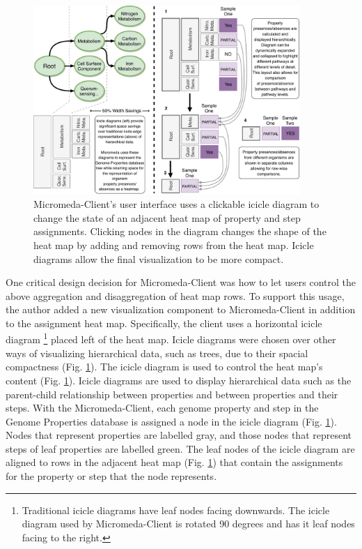 \begin{figure}[!ht]
  \centering
	\includegraphics[width=0.9\textwidth]{media/visualization_design_philosphy.pdf}
	 \caption{Micromeda-Client's user interface uses a clickable icicle diagram to change the state of an adjacent heat map of property and step assignments. Clicking nodes in the diagram changes the shape of the heat map by adding and removing rows from the heat map. Icicle diagrams allow the final visualization to be more compact.}
	 \label{fig:visualization-philosophy}
\end{figure}

One critical design decision for Micromeda-Client was how to let users control the above aggregation and disaggregation of heat map rows. To support this usage, the author added a new visualization component to Micromeda-Client in addition to the assignment heat map. Specifically, the client uses a horizontal icicle diagram \footnote{Traditional icicle diagrams have leaf nodes facing downwards. The icicle diagram used by Micromeda-Client is rotated 90 degrees and has it leaf nodes facing to the right.} placed left of the heat map. Icicle diagrams were chosen over other ways of visualizing hierarchical data, such as trees, due to their spacial compactness (Fig. \ref{fig:visualization-philosophy}). The icicle diagram is used to control the heat map's content (Fig. \ref{fig:visualization-philosophy}). Icicle diagrams are used to display hierarchical data such as the parent-child relationship between properties and between properties and their steps. With the Micromeda-Client, each genome property and step in the Genome Properties database is assigned a node in the icicle diagram (Fig. \ref{fig:visualization-philosophy}). Nodes that represent properties are labelled gray, and those nodes that represent steps of leaf properties are labelled green. The leaf nodes of the icicle diagram are aligned to rows in the adjacent heat map (Fig. \ref{fig:visualization-philosophy}) that contain the assignments for the property or step that the node represents.

